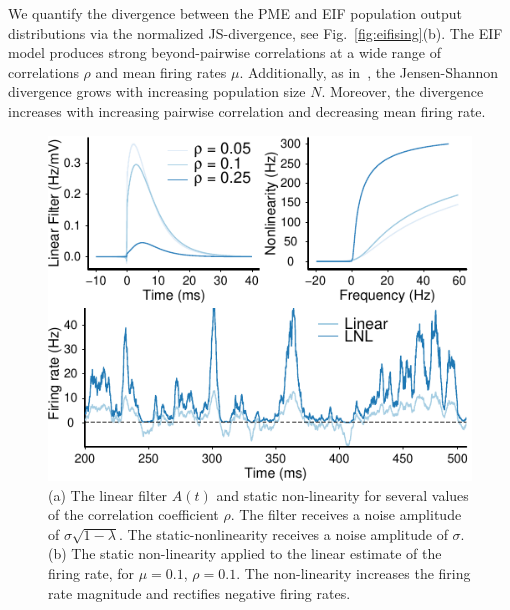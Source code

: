 \documentclass[%
 reprint,
 twocolumn,
 amsmath,amssymb,
 aps,
floatfix,
]{revtex4}
\begin{document}
We quantify the divergence between the PME and EIF population output distributions via the normalized JS-divergence, see Fig.~\ref{fig:eifising}(b). The EIF model produces strong beyond-pairwise correlations at a wide range of correlations $\rho$ and mean firing rates $\mu$. Additionally, as in~\cite{Macke, cf. Roudi}, the Jensen-Shannon divergence grows with increasing population size $N$. Moreover, the divergence increases with increasing pairwise correlation and decreasing mean firing rate.


\begin{figure}[t!]
\includegraphics{figures/fig_3a}
\caption{\label{fig:linearfilter} (a) The linear filter $A(t)$ and static non-linearity for several values of the correlation coefficient $\rho$. The filter receives a noise amplitude of $\sigma\sqrt{1-\lambda}$. The static-nonlinearity receives a noise amplitude of $\sigma$. (b) The static non-linearity applied to the linear estimate of the firing rate, for $\mu = 0.1$, $\rho = 0.1$. The non-linearity increases the firing rate magnitude and rectifies negative firing rates.}
\end{figure}
\end{document}
